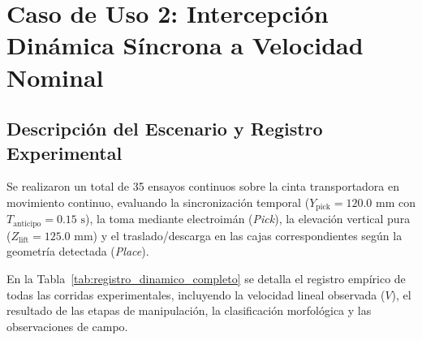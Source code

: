 \documentclass[12pt, a4paper]{report}
\begin{document}
\section{Caso de Uso 2: Intercepción Dinámica Síncrona a Velocidad Nominal}
\subsection{Descripción del Escenario y Registro Experimental}
Se realizaron un total de 35 ensayos continuos sobre la cinta transportadora en movimiento continuo, evaluando la sincronización temporal ($Y_{\text{pick}} = 120.0\text{ mm}$ con $T_{\text{anticipo}} = 0.15\text{ s}$), la toma mediante electroimán (\textit{Pick}), la elevación vertical pura ($Z_{\text{lift}} = 125.0\text{ mm}$) y el traslado/descarga en las cajas correspondientes según la geometría detectada (\textit{Place}).

En la Tabla~\ref{tab:registro_dinamico_completo} se detalla el registro empírico de todas las corridas experimentales, incluyendo la velocidad lineal observada ($V$), el resultado de las etapas de manipulación, la clasificación morfológica y las observaciones de campo.
\end{document}
